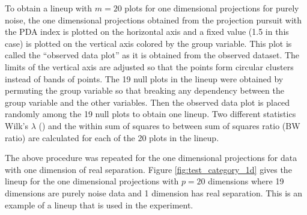 \documentclass[12]{article}
\begin{document}
To obtain a lineup with $m = 20$ plots for one dimensional projections for purely noise, the one dimensional projections obtained from the projection pursuit with the PDA index is plotted on the horizontal axis and a fixed value (1.5 in this case) is plotted on the vertical axis colored by the group variable. This plot is called the ``observed data plot'' as it is obtained from the observed dataset. The limits of the vertical axis are adjusted so that the points form circular clusters instead of bands of points. The 19 null plots in the lineup were obtained by  permuting the group variable so that breaking any dependency between the group variable and the other variables. Then the observed data plot is placed randomly among the 19 null plots to obtain one lineup. Two different statistics Wilk's $\lambda$ (\cite{JW02})  and the within sum of squares to between sum of squares ratio (BW ratio) are calculated for each of the 20 plots in the lineup. 

The above procedure was repeated for the one dimensional projections for data with one dimension of real separation. Figure \ref{fig:test_category_1d} gives the lineup  for the one dimensional projections with $p = 20$ dimensions where 19 dimensions are purely noise data and 1 dimension has real separation. This is an example of a lineup that is used in the experiment. 

\end{document}
